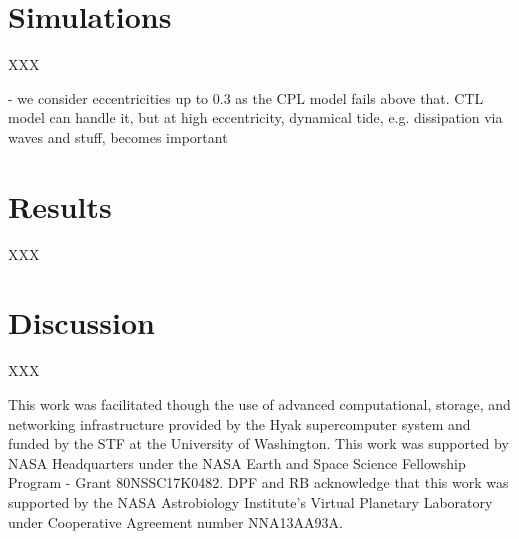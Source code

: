 \documentclass[twocolumn]{aastex61}
\def\lsim{~\rlap{$<$}{\lower 1.0ex\hbox{$\sim$}}}
\begin{document}

\section{Simulations} \label{sec:simulations}

XXX

- we consider eccentricities up to 0.3 as the CPL model fails above that.  CTL model can handle it, but at high eccentricity, dynamical tide, e.g. dissipation via waves and stuff, becomes important


\section{Results} \label{sec:results}

XXX



\section{Discussion} \label{sec:discussion}

XXX

\acknowledgments
This work was facilitated though the use of advanced computational, storage, and networking infrastructure provided by the Hyak supercomputer system and funded by the STF at the University of Washington. This work was supported by NASA Headquarters under the NASA Earth and Space Science Fellowship Program - Grant 80NSSC17K0482.  DPF and RB acknowledge that this work was supported by the NASA Astrobiology Institute's Virtual Planetary Laboratory under Cooperative Agreement number NNA13AA93A. 



\end{document}
